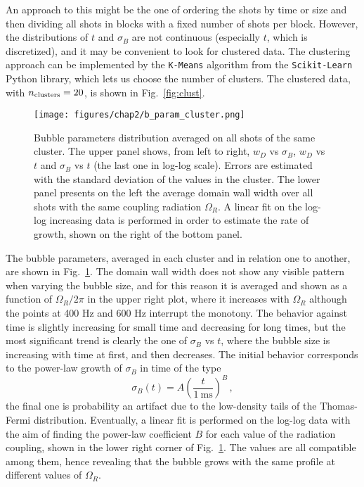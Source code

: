 An approach to this might be the one of ordering the shots by time or size and then dividing all shots in blocks with a fixed number of shots per block. However, the distributions of $t$ and $\sigma_B$ are not continuous (especially $t$, which is discretized), and it may be convenient to look for clustered data. 
The clustering approach can be implemented by the \texttt{K-Means} algorithm from the \texttt{Scikit-Learn} Python library, which lets us choose the number of clusters. The clustered data, with $n_{\rm clusters} = 20$, is shown in Fig.\ \ref{fig:clust}. 
\begin{figure}[ht!]
    \centering
    \texttt{[image: figures/chap2/b\_param\_cluster.png]}
    \caption{Bubble parameters distribution averaged on all shots of the same cluster. The upper panel shows, from left to right, $w_D$ vs $\sigma_B$, $w_D$ vs $t$ and $\sigma_B$ vs $t$ (the last one in log-log scale). Errors are estimated with the standard deviation of the values in the cluster. The lower panel presents on the left the average domain wall width over all shots with the same coupling radiation $\Omega_R$. A linear fit on the log-log increasing data is performed in order to estimate the rate of growth, shown on the right of the bottom panel.}
    \label{fig:b_param}
\end{figure}

The bubble parameters, averaged in each cluster and in relation one to another, are shown in Fig.\ \ref{fig:b_param}. The domain wall width does not show any visible pattern when varying the bubble size, and for this reason it is averaged and shown as a function of $\Omega_R/2\pi$ in the upper right plot, where it increases with $\Omega_R$ although the points at 400 Hz and 600 Hz interrupt the monotony. The behavior against time is slightly increasing for small time and decreasing for long times, but the most significant trend is clearly the one of $\sigma_B$ vs $t$, where the bubble size is increasing with time at first, and then decreases. The initial behavior corresponds to the power-law growth of $\sigma_B$ in time of the type
\[
    \sigma_B(t) = A\left(\frac{t}{1\ \unit{\milli\second}}\right)^B\, , 
\]
the final one is probability an artifact due to the low-density tails of the Thomas-Fermi distribution. Eventually, a linear fit is performed on the log-log data with the aim of finding the power-law coefficient $B$ for each value of the radiation coupling, shown in the lower right corner of Fig.\ \ref{fig:b_param}. The values are all compatible among them, hence revealing that the bubble grows with the same profile at different values of $\Omega_R$.

